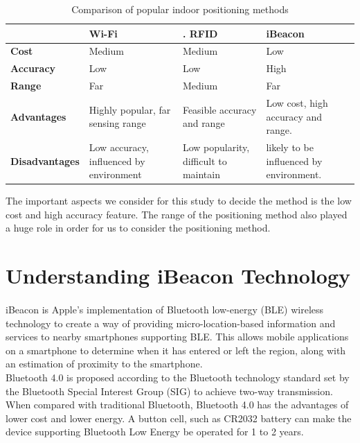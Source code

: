 \documentclass[12pt]{article}
\begin{document}
\begin{table}%
    \centering
   
    \label{my-label2}
       \begin{tabular}{|p{30mm}|p{30mm}|p{30mm}|p{30mm}|}
 \hline
  & \textbf{Wi-Fi }&.        \textbf{RFID} &  \textbf{iBeacon} \\ [0.5ex] 
 \hline\hline
 \textbf{Cost} & Medium & Medium & Low \\ 
 \hline
 \textbf{Accuracy} & Low & Low & High \\
 \hline
 \textbf{Range} & Far & Medium & Far \\
 \hline
 \textbf{Advantages} & Highly popular, far sensing range & Feasible accuracy and range & Low cost, high accuracy and range. \\
 \hline
 \textbf{Disadvantages} & Low accuracy, influenced by environment & Low popularity, difficult to maintain & likely to be influenced by environment. \\ [1ex] 
 \hline
    \end{tabular}
     \caption{Comparison of popular indoor positioning methods} {The important aspects we consider for this study to decide the method is the low cost and high accuracy feature. The range of the positioning method also played a huge role in order for us to consider the positioning method.}
\end{table}

\section{Understanding iBeacon Technology}
\label{iBeacon-tech}
\paragraph{}iBeacon is Apple’s implementation of Bluetooth low-energy (BLE) wireless technology to create a way of providing micro-location-based information and services to nearby smartphones supporting BLE. This allows mobile applications on a smartphone to determine when it has entered or left the region, along with an estimation of proximity to the smartphone. \\

Bluetooth 4.0 is proposed according to the Bluetooth technology standard set by the Bluetooth Special Interest Group (SIG) to achieve two-way transmission. When compared with traditional Bluetooth, Bluetooth 4.0 has the advantages of lower cost and lower energy. A button cell, such as CR2032 battery can make the device supporting Bluetooth Low Energy be operated for 1 to 2 years. \cite{taiwan} \\
\end{document}

